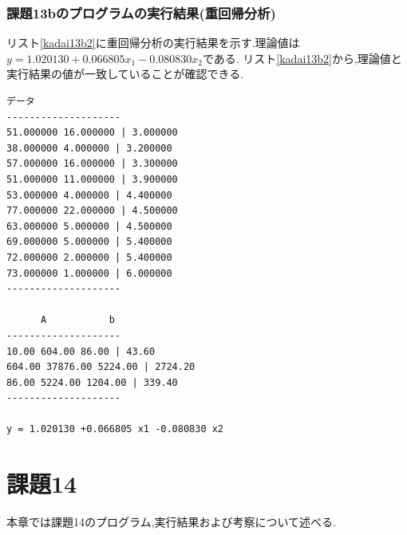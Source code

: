 \documentclass[a4j]{jarticle}
\begin{document}
      \subsubsection{課題13bのプログラムの実行結果(重回帰分析)}
      リスト\ref{kadai13b2}に重回帰分析の実行結果を示す.理論値は$y = 1.020130 +0.066805 x_1 -0.080830 x_2 $である.
      リスト\ref{kadai13b2}から,理論値と実行結果の値が一致していることが確認できる.
      \begin{lstlisting}[basicstyle=\ttfamily\footnotesize, frame=single,label=kadai13b2,caption=課題13bのプログラムの実行結果(重回帰分析)]
       データ       
--------------------
51.000000 16.000000 | 3.000000 
38.000000 4.000000 | 3.200000 
57.000000 16.000000 | 3.300000 
51.000000 11.000000 | 3.900000 
53.000000 4.000000 | 4.400000 
77.000000 22.000000 | 4.500000 
63.000000 5.000000 | 4.500000 
69.000000 5.000000 | 5.400000 
72.000000 2.000000 | 5.400000 
73.000000 1.000000 | 6.000000 
--------------------

      A           b 
--------------------
10.00 604.00 86.00 | 43.60
604.00 37876.00 5224.00 | 2724.20
86.00 5224.00 1204.00 | 339.40
--------------------

y = 1.020130 +0.066805 x1 -0.080830 x2 
      \end{lstlisting}

      \section{課題14}
      本章では課題14のプログラム,実行結果および考察について述べる.
\end{document}
